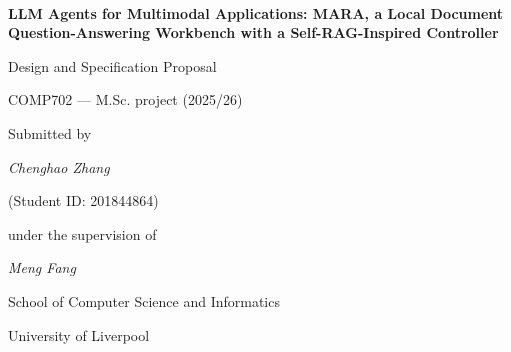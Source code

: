 \documentclass[a4paper,11pt]{article}
\begin{document}

\thispagestyle{empty}

~\vspace{1.5cm}
\begin{center}
{\LARGE\bf
LLM Agents for Multimodal Applications: MARA, a Local Document Question-Answering Workbench with a Self-RAG-Inspired Controller}

\bigskip\bigskip
{\large
Design and Specification Proposal}

\smallskip
COMP702 --- M.Sc. project (2025/26)

\vfill
{\large
Submitted by}

{\large
\emph{Chenghao Zhang}}

{\large
(Student ID: 201844864)}

\bigskip\bigskip
{\large
under the supervision of}

{\large
\emph{Meng Fang}}

\vspace{4cm}

{\large\sc
School of Computer Science and Informatics}

\smallskip
{\large\sc
University of Liverpool}
\end{center}

\pagebreak
\setcounter{page}{1}

\begin{abstract}
MARA (Multimodal Agentic Retrieval and Answering) is a proposed local-first document question-answering workbench for mixed academic and technical documents. Its main technical feature is a Self-RAG-inspired controller: a program component that decides how the system should answer each question. The core system will support document upload, indexing, source selection, citation-backed answers, evidence preview and a shared Web/CLI workflow. Secondary workbench features, such as knowledge-map context, notes and learning materials, may be included where they remain supported by evidence and project time. Instead of using one fixed retrieval-augmented generation (RAG) pipeline, MARA can answer directly, retrieve text, use at least one non-text evidence route such as page-image or document-element retrieval, use scoped graph context, combine routes, check evidence, retry, revise or abstain. The analytical component will use technical tests, demonstration tasks and a small labelled route comparison to support, rather than dominate, the project.
\end{abstract}
\end{document}
